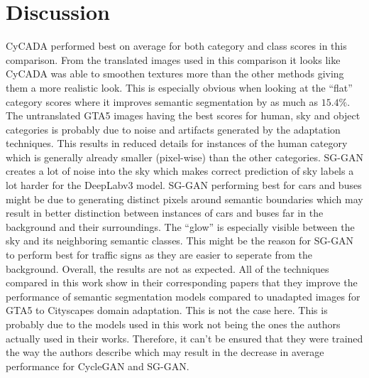 \newpage

\section{Discussion}
CyCADA performed best on average for both category and class scores in this comparison. From the translated images used in this comparison it looks like CyCADA was able to smoothen textures more than the other methods giving them a more realistic look. This is especially obvious when looking at the ``flat'' category scores where it improves semantic segmentation by as much as $15.4\%$. The untranslated GTA5 images having the best scores for human, sky and object categories is probably due to noise and artifacts generated by the adaptation techniques. This results in reduced details for instances of the human category which is generally already smaller (pixel-wise) than the other categories. SG-GAN creates a lot of noise into the sky which makes correct prediction of sky labels a lot harder for the DeepLabv3 model. SG-GAN performing best for cars and buses might be due to generating distinct pixels around semantic boundaries which may result in better distinction between instances of cars and buses far in the background and their surroundings. The ``glow'' is especially visible between the sky and its neighboring semantic classes. This might be the reason for SG-GAN to perform best for traffic signs as they are easier to seperate from the background. Overall, the results are not as expected. All of the techniques compared in this work show in their corresponding papers that they improve the performance of semantic segmentation models compared to unadapted images for GTA5 to Cityscapes domain adaptation. This is not the case here. This is probably due to the models used in this work not being the ones the authors actually used in their works. Therefore, it can't be ensured that they were trained the way the authors describe which may result in the decrease in average performance for CycleGAN and SG-GAN. 
